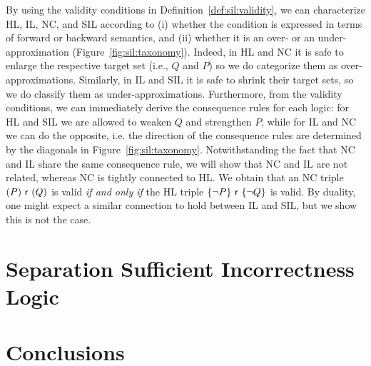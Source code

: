 By using the validity conditions in Definition~\ref{def:sil:validity}, we can characterize HL, IL, NC, and SIL according to (i) whether the condition is expressed in terms of forward or backward semantics, and (ii) whether it is an over- or an under-approximation (Figure~\ref{fig:sil:taxonomy}).
Indeed, in HL and NC it is safe to enlarge the respective target set (i.e., $Q$ and $P$) so we do categorize them as over-approximations.
Similarly, in IL and SIL it is safe to shrink their target sets, so we do classify them as under-approximations.
Furthermore, from the validity conditions, we can immediately derive the consequence rules for each logic: for HL and SIL we are allowed to weaken $Q$ and strengthen $P$, while for IL and NC we can do the opposite, i.e. the direction of the consequence rules are determined by the diagonals in Figure~\ref{fig:sil:taxonomy}.
Notwithstanding the fact that NC and IL share the same consequence rule, we will show that NC and IL are not related, whereas NC is tightly connected to HL.
We obtain that an NC triple $(P)~\mathsf{r}~(Q)$ is valid \emph{if and only if} the HL triple $\{\lnot P\}~\mathsf{r}~\{\lnot Q\}$ is valid.
%
By duality, one might expect a similar connection to hold between IL and SIL, but we show this is not the case.

\section{Separation Sufficient Incorrectness Logic}

\section{Conclusions}
